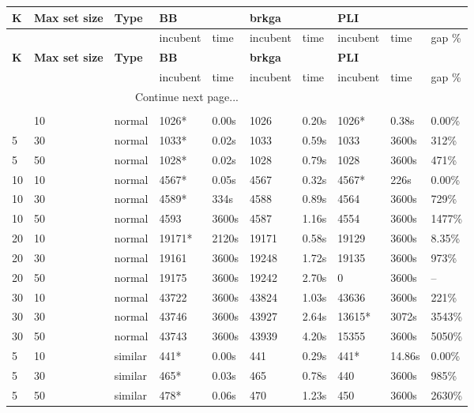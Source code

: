 \begin{scriptsize}
\setlength\LTleft{0pt}            %
\setlength\LTright{0pt}           %
\label{table:tests}
\begin{longtable}{@{\extracolsep{\fill}}l|l|l|ll|ll|lll@{}}
\hline
\textbf{K} & \textbf{Max set size} & \textbf{Type} & \textbf{BB} & & \textbf{brkga} & & \textbf{PLI}\\ 
\hline
& & & incubent & time & incubent & time & incubent & time & gap \%\\ 
\hline
\endfirsthead
\hline
\textbf{K} & \textbf{Max set size} & \textbf{Type} & \textbf{BB} & & \textbf{brkga} & & \textbf{PLI}\\ 
\hline
& & & incubent & time & incubent & time & incubent & time & gap \%\\ 
\hline
\endhead
\hline \multicolumn{5}{r}{{Continue next page...}} \\ 
\endfoot
\multicolumn{5}{r}{{}} \\ 
\endlastfoot
 5 & 10 & normal& 1026*& 0.00s& 1026& 0.20s & 1026*& 0.38s & 0.00\% \\
 5 & 30 & normal& 1033*& 0.02s& 1033& 0.59s & 1033& 3600s& 312\% \\
 5 & 50 & normal& 1028*& 0.02s& 1028& 0.79s & 1028& 3600s& 471\% \\
 10 & 10 & normal& 4567*& 0.05s& 4567& 0.32s & 4567*& 226s & 0.00\% \\
 10 & 30 & normal& 4589*& 334s & 4588& 0.89s & 4564& 3600s& 729\% \\
 10 & 50 & normal& 4593& 3600s& 4587& 1.16s & 4554& 3600s& 1477\% \\
 20 & 10 & normal& 19171*& 2120s & 19171& 0.58s & 19129& 3600s& 8.35\% \\
 20 & 30 & normal& 19161& 3600s& 19248& 1.72s & 19135& 3600s& 973\% \\
 20 & 50 & normal& 19175& 3600s& 19242& 2.70s & 0& 3600s& -- \\
 30 & 10 & normal& 43722& 3600s& 43824& 1.03s & 43636& 3600s& 221\% \\
 30 & 30 & normal& 43746& 3600s& 43927& 2.64s & 13615*& 3072s & 3543\% \\
 30 & 50 & normal& 43743& 3600s& 43939& 4.20s & 15355& 3600s& 5050\% \\
 5 & 10 & similar& 441*& 0.00s& 441& 0.29s & 441*& 14.86s & 0.00\% \\
 5 & 30 & similar& 465*& 0.03s& 465& 0.78s & 440& 3600s& 985\% \\
 5 & 50 & similar& 478*& 0.06s& 470& 1.23s & 450& 3600s& 2630\% \\

\end{longtable}
\end{scriptsize}
